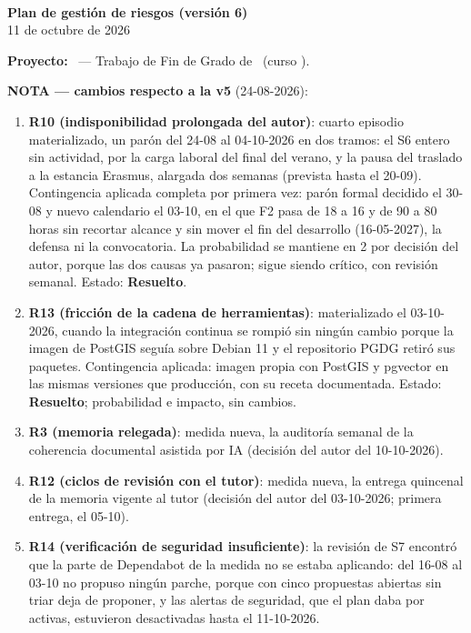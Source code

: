 \documentclass[11pt,a4paper]{article}
\begin{document}
\begin{center}
  {\Huge\bfseries\bukit}\\[0.5cm]
  {\Large\bfseries Plan de gestión de riesgos (versión 6)}\\[0.4cm]
  {\large 11 de octubre de 2026}
\end{center}
\vspace{0.6cm}

\textbf{Proyecto:} \thesisTitle\ — Trabajo de Fin de Grado de \thesisAuthor\ (curso \thesisCourse).

\textbf{NOTA — cambios respecto a la v5} (24-08-2026):
\begin{enumerate}
  \item \textbf{R10 (indisponibilidad prolongada del autor)}: cuarto episodio materializado, un parón del 24-08 al 04-10-2026 en dos tramos: el  S6 entero sin actividad, por la carga laboral del final del verano, y la pausa del traslado a la estancia Erasmus, alargada dos semanas (prevista hasta el 20-09).
  Contingencia aplicada completa por primera vez: parón formal decidido el 30-08 y nuevo calendario el 03-10, en el que F2 pasa de 18 a 16  y de 90 a 80 horas sin recortar alcance y sin mover el fin del desarrollo (16-05-2027), la defensa ni la convocatoria.
  La probabilidad se mantiene en 2 por decisión del autor, porque las dos causas ya pasaron; sigue siendo crítico, con revisión semanal.
  Estado: \textbf{Resuelto}.
  \item \textbf{R13 (fricción de la cadena de herramientas)}: materializado el 03-10-2026, cuando la integración continua se rompió sin ningún cambio porque la imagen de PostGIS seguía sobre Debian 11 y el repositorio PGDG retiró sus paquetes.
  Contingencia aplicada: imagen propia con PostGIS y pgvector en las mismas versiones que producción, con su receta documentada.
  Estado: \textbf{Resuelto}; probabilidad e impacto, sin cambios.
  \item \textbf{R3 (memoria relegada)}: medida nueva, la auditoría semanal de la coherencia documental asistida por IA (decisión del autor del 10-10-2026).
  \item \textbf{R12 (ciclos de revisión con el tutor)}: medida nueva, la entrega quincenal de la memoria vigente al tutor (decisión del autor del 03-10-2026; primera entrega, el 05-10).
  \item \textbf{R14 (verificación de seguridad insuficiente)}: la revisión de S7 encontró que la parte de Dependabot de la medida no se estaba aplicando: del 16-08 al 03-10 no propuso ningún parche, porque con cinco propuestas abiertas sin triar deja de proponer, y las alertas de seguridad, que el plan daba por activas, estuvieron desactivadas hasta el 11-10-2026.

\end{enumerate}
\end{document}
